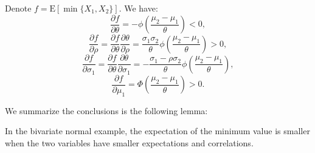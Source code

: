 \documentclass[opre,sglanonrev]{informs4}
\begin{document}
Denote $f=\text{E}[\min\{X_1, X_2\}] $. We have:
\begin{equation}
	\frac{\partial f}{\partial \theta} = -\phi(\frac{\mu_2-\mu_1}{\theta})<0,
\end{equation}
\begin{equation}
	\label{rho}
	\frac{\partial f}{\partial \rho} = \frac{\partial f}{\partial \theta} \frac{\partial \theta}{\partial \rho} =  \frac{\sigma_1\sigma_2}{\theta}\phi(\frac{\mu_2-\mu_1}{\theta})>0,
\end{equation}
\begin{equation}
	\label{sigma}
	\frac{\partial f}{\partial \sigma_1} = \frac{\partial f}{\partial \theta} \frac{\partial \theta}{\partial \sigma_1} = -\frac{\sigma_1-\rho\sigma_2}{\theta} \phi(\frac{\mu_2-\mu_1}{\theta}),
\end{equation}
\begin{equation}
	\label{mu}
	\frac{\partial f}{\partial \mu_1} = \Phi( \frac{\mu_2-\mu_1}{\theta})>0.
\end{equation}

We summarize the conclusions is the following lemma:
\begin{lemma}
	In the bivariate normal example, the expectation of the minimum value is smaller when the two variables have smaller expectations and correlations.
\end{lemma}
\end{document}

